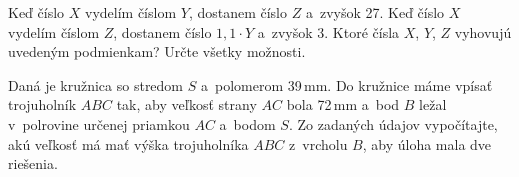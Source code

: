 {%
Keď číslo $X$ vydelím číslom $Y$, dostanem číslo $Z$ a~zvyšok 27.
Keď číslo $X$ vydelím číslom $Z$, dostanem číslo $1{,}1\cdot Y$ a~zvyšok 3.
Ktoré čísla $X$, $Y$, $Z$ vyhovujú uvedeným podmienkam?
Určte všetky možnosti.
}

{%
Daná je kružnica so stredom $S$ a~polomerom 39\,mm.
Do kružnice máme vpísať trojuholník $ABC$ tak, aby veľkosť strany $AC$ bola 72\,mm a~bod $B$ ležal v~polrovine určenej priamkou $AC$ a~bodom $S$.
Zo zadaných údajov vypočítajte, akú veľkosť má mať výška trojuholníka $ABC$ z~vrcholu $B$, aby úloha mala dve riešenia.
}
